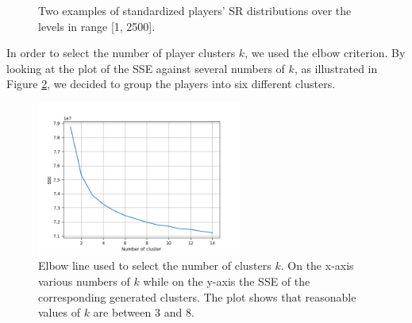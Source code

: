 \begin{figure}[h]
  \centering
    \caption{Two examples of standardized players' SR distributions over the levels in range [1, 2500]. 
    }
    \label{fig:player_distribution}
\end{figure}
\noindent
In order to select the number of player clusters $k$, we used the elbow criterion. By looking at the plot of the SSE against several numbers of $k$, as illustrated in Figure \ref{fig:select_k}, we decided to group the players into six different clusters. 
\begin{figure}[h]
  \centering
    \includegraphics[width=0.6\textwidth]{masters-thesis-master/masters-thesis/contents/04_results/clustering_players_images/select_k.png}
    \caption{Elbow line used to select the number of clusters $k$. On the x-axis various numbers of $k$ while on the y-axis the SSE of the corresponding generated clusters. The plot shows that reasonable values of $k$ are between 3 and 8.}
    \label{fig:select_k}
\end{figure}
